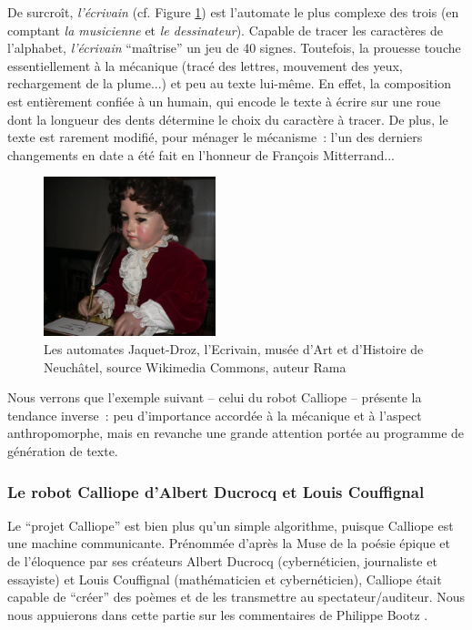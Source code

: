 \documentclass{article}
\begin{document}
				De surcroît, \textit{l'écrivain} (cf. Figure \ref{fig:automate_jaquet_droz}) est l'automate le plus complexe des trois (en comptant \textit{la musicienne} et \textit{le dessinateur}). Capable de tracer les caractères de l'alphabet, \textit{l'écrivain} ``maîtrise'' un jeu de 40 signes. Toutefois, la prouesse touche essentiellement à la mécanique (tracé des lettres, mouvement des yeux, rechargement de la plume...) et peu au texte lui-même. En effet, la composition est entièrement confiée à un humain, qui encode le texte à écrire sur une roue dont la longueur des dents détermine le choix du caractère à tracer. De plus, le texte est rarement modifié, pour ménager le mécanisme~: l'un des derniers changements en date a été fait en l'honneur de François Mitterrand...
				\begin{figure}
					\centering
					\includegraphics[width=5cm]{automate_jaquet_droz.jpg}
					\caption{Les automates Jaquet-Droz, l'Ecrivain, musée d'Art et d'Histoire de Neuchâtel, source Wikimedia Commons, auteur Rama}
					\label{fig:automate_jaquet_droz}
				\end{figure}
				Nous verrons que l'exemple suivant -- celui du robot Calliope -- présente la tendance inverse~: peu d'importance accordée à la mécanique et à l'aspect anthropomorphe, mais en revanche une grande attention portée au programme de génération de texte.
			\subsubsection{Le robot Calliope d'Albert Ducrocq et Louis Couffignal}
				Le ``projet Calliope'' est bien plus qu'un simple algorithme, puisque Calliope est une machine communicante. Prénommée d'après la Muse de la poésie épique et de l'éloquence par ses créateurs Albert Ducrocq (cybernéticien, journaliste et essayiste) et Louis Couffignal (mathématicien et cybernéticien), Calliope était capable de ``créer'' des poèmes et de les transmettre au spectateur/auditeur. Nous nous appuierons dans cette partie sur les commentaires de Philippe Bootz \cite{bootz}.\\
				
\end{document}
